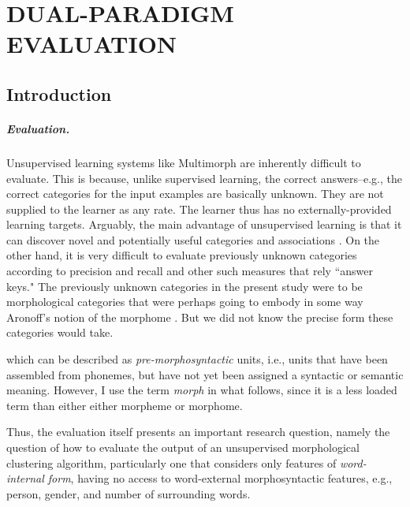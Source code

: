 \chapter{DUAL-PARADIGM EVALUATION}
\label{ch:eval}

\section{Introduction}

\paragraph{Evaluation.} Unsupervised learning systems like Multimorph are inherently difficult to evaluate. This is because, unlike supervised learning, the correct answers--e.g., the correct
categories for the input examples are basically unknown. They are not supplied to the learner as  any rate. The learner thus has no externally-provided learning targets. 
Arguably, the main advantage of unsupervised learning is that it can discover novel and potentially useful categories and associations \citep{parsons:2004}. On the other hand, it is very difficult to evaluate previously unknown categories according to precision and recall and other such measures that rely ``answer keys." 
The previously unknown categories in the present study were to be morphological 
categories that were perhaps going to embody in some way Aronoff's notion of the morphome \citep{aronoff:1994}.  But we did not know the precise form these categories would take. 



which can be described as 
\emph{pre-morphosyntactic} units, i.e., units that have been assembled from 
phonemes, but have not yet been assigned 
a syntactic or semantic meaning. However,  I use the term \emph{morph} in what follows, since it is a less loaded term than either
either morpheme or morphome.

Thus, the evaluation itself presents an important research question, namely the question 
of how to evaluate the output of an unsupervised morphological clustering algorithm, 
particularly one that considers only features of \emph{word-internal form}, having no 
access to word-external morphosyntactic features, e.g., person, gender, and 
number of surrounding words.

